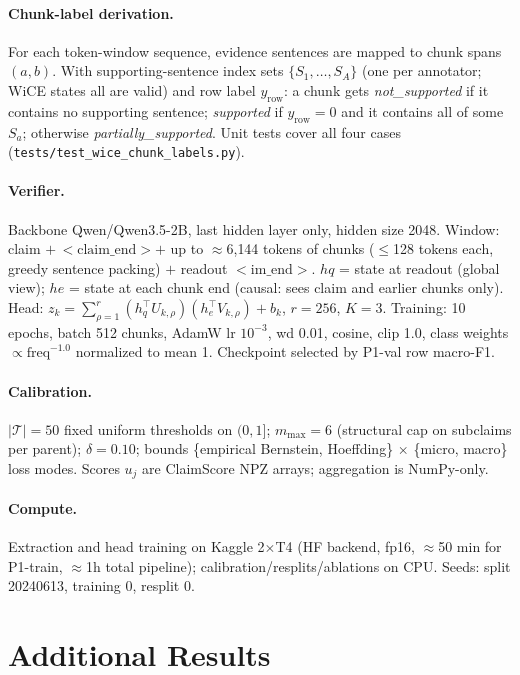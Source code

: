 \documentclass{article}
\begin{document}
\paragraph{Chunk-label derivation.}
For each token-window sequence, evidence sentences are mapped to chunk
spans $(a,b)$. With supporting-sentence index sets
$\{S_1,\dots,S_A\}$ (one per annotator; WiCE states all are valid) and
row label $y_{\mathrm{row}}$: a chunk gets \emph{not\_supported} if it
contains no supporting sentence; \emph{supported} if
$y_{\mathrm{row}}{=}0$ and it contains all of some $S_a$; otherwise
\emph{partially\_supported}. Unit tests cover all four cases
(\texttt{tests/test\_wice\_chunk\_labels.py}).

\paragraph{Verifier.}
Backbone Qwen/Qwen3.5-2B, last hidden layer only, hidden size 2048.
Window: claim $+\,<\text{claim\_end}> +$ up to $\approx$6{,}144 tokens
of chunks ($\le$128 tokens each, greedy sentence packing) $+$ readout
$<\text{im\_end}>$. $hq$ = state at readout (global view); $he$ = state
at each chunk end (causal: sees claim and earlier chunks only).
Head: $z_k=\sum_{\rho=1}^{r}(h_q^\top U_{k,\rho})(h_e^\top
V_{k,\rho})+b_k$, $r{=}256$, $K{=}3$. Training: 10 epochs, batch 512
chunks, AdamW lr $10^{-3}$, wd 0.01, cosine, clip 1.0, class weights
$\propto\text{freq}^{-1.0}$ normalized to mean 1. Checkpoint selected
by P1-val row macro-F1.

\paragraph{Calibration.}
$|\mathcal{T}|{=}50$ fixed uniform thresholds on $(0,1]$;
$m_{\max}{=}6$ (structural cap on subclaims per parent);
$\delta{=}0.10$; bounds \{empirical Bernstein, Hoeffding\}
$\times$ \{micro, macro\} loss modes. Scores $u_j$ are ClaimScore NPZ
arrays; aggregation is NumPy-only.

\paragraph{Compute.}
Extraction and head training on Kaggle 2$\times$T4 (HF backend,
fp16, $\approx$50 min for P1-train, $\approx$1h total pipeline);
calibration/resplits/ablations on CPU. Seeds: split 20240613,
training 0, resplit 0.

\section{Additional Results}
\label{app:results}
\end{document}
